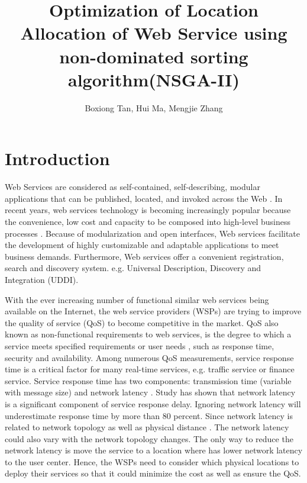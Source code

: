 \documentclass{llncs}
\title{
Optimization of Location Allocation of Web Service using non-dominated sorting algorithm(NSGA-II)
}
\author{Boxiong Tan, Hui Ma, Mengjie Zhang}
\institute{School of Engineering and Computer Science,
\\Victoria University of Wellington, New Zealand \\
\email{\{Boxiong.Tan, Hui.Ma, Mengjie.Zhang\}@ecs.vuw.ac.nz}}
\begin{document}
\maketitle

\begin{abstract}

\end{abstract}

\section{Introduction}
Web Services are considered as self-contained, self-describing, modular applications that can be published, located, and invoked across the Web \cite{Ran}. 
In recent years, web services technology is becoming increasingly popular because the convenience, low cost and capacity to be composed into high-level business processes \cite{Aboolian}.
Because of modularization and open interfaces, Web services facilitate the development of highly 
customizable and adaptable applications to meet business demands. Furthermore, Web services offer a 
convenient registration, search  and discovery system. e.g. Universal Description, Discovery and Integration (UDDI). 

With the ever increasing number of functional similar web services being available on the Internet, the web service providers (WSPs) are trying to improve the quality of service (QoS) to become competitive in the market.  
QoS also known as non-functional requirements to  web services, is the degree to which a service meets specified requirements or user needs \cite{4061431}, such as response time, security and availability. 
Among numerous QoS measurements, service response time is a critical factor for many real-time services, e.g. traffic service or finance service. 
Service response time has two components: transmission time (variable with message size) and network latency \cite{Johansson}. 
Study \cite{916684} has shown that network latency is a significant component of service response delay.
Ignoring network latency will underestimate response time by more than 80 percent. Since network latency is related to network topology as well as physical distance \cite{distanceMetrics}. 
The network latency could also vary with the network topology changes.
The only way to reduce the network latency is move the service to a location where has lower network latency to the user center. 
Hence, the WSPs need to consider which physical locations to deploy their services so that it could minimize the cost as well as ensure the QoS.
\end{document}
